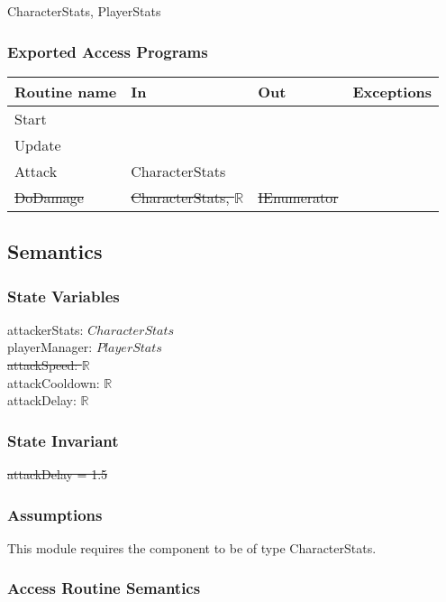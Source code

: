 \documentclass[12pt]{article}
\begin{document}
CharacterStats,  {\color{magenta} PlayerStats}

\subsubsection* {Exported Access Programs}

\begin{tabular}{| l | l | l | l |}
\hline
\textbf{Routine name} & \textbf{In} & \textbf{Out} & \textbf{Exceptions}\\
\hline
Start & ~ & ~  & ~\\
Update & ~ & ~ & ~\\
Attack & CharacterStats & ~ & ~\\
\sout{DoDamage} & \sout{CharacterStats, $\mathbb{R}$} & \sout{IEnumerator} & ~\\
\hline
\end{tabular}

\subsection* {Semantics}

\subsubsection* {State Variables}

attackerStats: $CharacterStats$\\
{\color{magenta} playerManager: $PlayerStats$}\\
\sout{attackSpeed: $\mathbb{R}$} \\
attackCooldown: $\mathbb{R}$ \\
attackDelay: $\mathbb{R}$ \\

\subsubsection* {State Invariant}

\sout{attackDelay = 1.5}

\subsubsection* {Assumptions}

This module requires the component to be of type CharacterStats. 

\subsubsection* {Access Routine Semantics}
\end{document}
